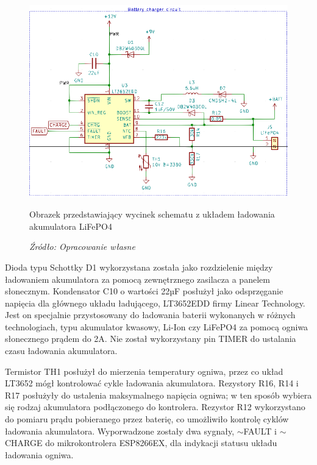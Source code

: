 \documentclass[12pt,a4paper,oneside]{memoir}
\begin{document}
\begin{figure}[!h]
	\centering
	\includegraphics[scale=0.45]{images/sch/sch-04.png}
	{\tytulyrozdzialow \footnotesize \caption[Schemat - ładowanie akumulatora] {Obrazek przedstawiający wycinek schematu z układem ładowania akumulatora LiFePO4}}
	\caption*{\textit{Źródło: Opracowanie własne}}
\end{figure}
\par Dioda typu Schottky D1 wykorzystana została jako rozdzielenie między ładowaniem akumulatora za pomocą zewnętrznego zasilacza a panelem słonecznym. Kondensator C10 o wartości 22µF posłużył jako odsprzęganie napięcia dla głównego układu ładującego, LT3652EDD firmy Linear Technology. Jest on specjalnie przystosowany do ładowania baterii wykonanych w różnych technologiach, typu akumulator kwasowy, Li-Ion czy LiFePO4 za pomocą ogniwa słonecznego prądem do 2A. Nie został wykorzystany pin TIMER do ustalania czasu ładowania akumulatora. 
\par Termistor TH1 posłużył do mierzenia temperatury ogniwa, przez co układ LT3652 mógł kontrolować cykle ładowania akumulatora. Rezystory R16, R14 i R17 posłużyły do ustalenia maksymalnego napięcia ogniwa; w ten sposób wybiera się rodzaj akumulatora podłączonego do kontrolera. Rezystor R12 wykorzystano do pomiaru prądu pobieranego przez baterię, co umożliwiło kontrolę cyklów ładowania akumulatora. Wyporwadzone zostały dwa sygnały, {$\sim$FAULT} i {$\sim$CHARGE} do mikrokontrolera ESP8266EX, dla indykacji statusu układu ładowania ogniwa.
\end{document}

